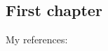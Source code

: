 \documentclass[../main]{subfiles}
\begin{document}
\begin{bibunit}
\chapter{First chapter}

My references: \cite{A}

\end{bibunit}
\end{document}
